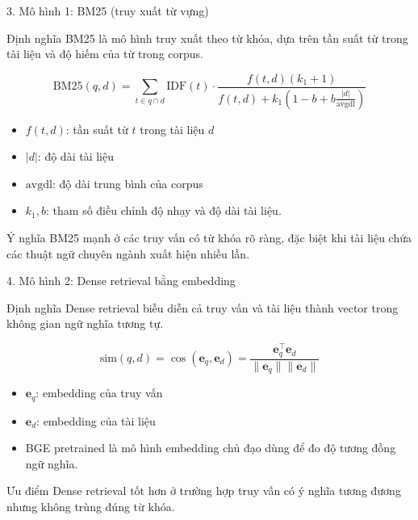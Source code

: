 \documentclass[aspectratio=169]{beamer}
\begin{document}
\begin{frame}{3. Mô hình 1: BM25 (truy xuất từ vựng)}
  \begin{block}{Định nghĩa}
    BM25 là mô hình truy xuất theo từ khóa, dựa trên tần suất từ trong tài liệu và độ hiếm của từ trong corpus.
  \end{block}

  \begin{equation}
    \mathrm{BM25}(q,d) = \sum_{t \in q \cap d} \mathrm{IDF}(t) \cdot \frac{f(t,d)(k_1+1)}{f(t,d)+k_1\left(1-b+b\frac{|d|}{\mathrm{avgdl}}\right)}
  \end{equation}

  \begin{itemize}
    \item $f(t,d)$: tần suất từ $t$ trong tài liệu $d$\
    \item $|d|$: độ dài tài liệu\
    \item $\mathrm{avgdl}$: độ dài trung bình của corpus\
    \item $k_1, b$: tham số điều chỉnh độ nhạy và độ dài tài liệu.
  \end{itemize}

  \vspace{0.2cm}
  \begin{block}{Ý nghĩa}
    BM25 mạnh ở các truy vấn có từ khóa rõ ràng, đặc biệt khi tài liệu chứa các thuật ngữ chuyên ngành xuất hiện nhiều lần.
  \end{block}
\end{frame}

\begin{frame}{4. Mô hình 2: Dense retrieval bằng embedding}
  \begin{block}{Định nghĩa}
    Dense retrieval biễu diễn cả truy vấn và tài liệu thành vector trong không gian ngữ nghĩa tương tự.
  \end{block}

  \begin{equation}
    \mathrm{sim}(q,d)=\cos(\mathbf{e}_q,\mathbf{e}_d)=\frac{\mathbf{e}_q^\top \mathbf{e}_d}{\|\mathbf{e}_q\|\|\mathbf{e}_d\|}
  \end{equation}

  \begin{itemize}
    \item $\mathbf{e}_q$: embedding của truy vấn\
    \item $\mathbf{e}_d$: embedding của tài liệu\
    \item BGE pretrained là mô hình embedding chủ đạo dùng để đo độ tương đồng ngữ nghĩa.\
  \end{itemize}

  \vspace{0.2cm}
  \begin{block}{Ưu điểm}
    Dense retrieval tốt hơn ở trường hợp truy vấn có ý nghĩa tương đương nhưng không trùng đúng từ khóa.
  \end{block}
\end{frame}
\end{document}
